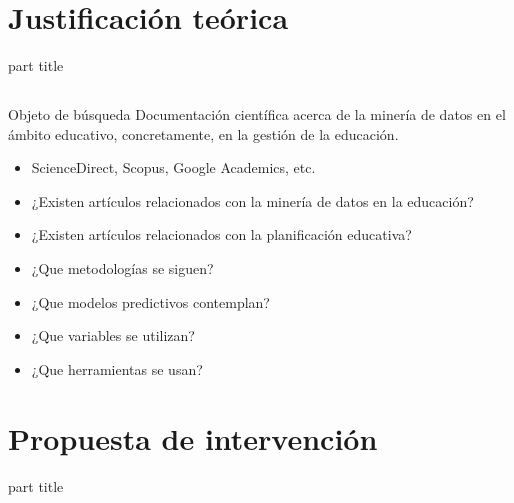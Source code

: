 \documentclass{beamer}
\begin{document}
\section{Justificación teórica}
\begin{frame}
\begin{center}
	\begin{beamercolorbox}[
		sep=8pt,center,rounded=true,shadow=true]{part title}
		\secname
	\end{beamercolorbox}
\end{center}
\end{frame}

\subsection{}
\begin{frame}
\frametitle{\secname}
\begin{block}{Objeto de búsqueda}
	Documentación científica acerca de la minería de datos en el ámbito educativo, concretamente, en la gestión de la educación.
	\begin{itemize}
		\item ScienceDirect, Scopus, Google Academics, etc.
	\end{itemize}
\end{block}

\begin{itemize}
	\item ¿Existen artículos relacionados con la minería de datos en la educación?
	\item ¿Existen artículos relacionados con la planificación educativa?
	\item ¿Que metodologías se siguen?
	\item ¿Que modelos predictivos contemplan?
	\item ¿Que variables se utilizan?
	\item ¿Que herramientas se usan?
\end{itemize}

\end{frame}

\section{Propuesta de intervención}
\begin{frame}
\begin{center}
	\begin{beamercolorbox}[
		sep=8pt,center,rounded=true,shadow=true]{part title}
		\secname
	\end{beamercolorbox}
\end{center}
\end{frame}
\end{document}
